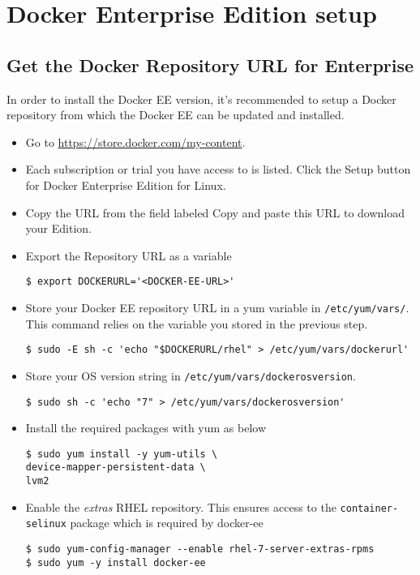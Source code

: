\documentclass[11pt]{article}
\author{Sampath Singamsetty}
\date{\today}
\title{}
\begin{document}
\tableofcontents

\section{Docker Enterprise Edition setup}
\label{sec:orga56b331}
\subsection{Get the Docker Repository URL for Enterprise}
\label{sec:orgcea4a15}
In order to install the Docker EE version, it's recommended to setup a Docker repository from which the Docker EE can be updated and installed.
\begin{itemize}
\item Go to \url{https://store.docker.com/my-content}.
\item Each subscription or trial you have access to is listed. Click the Setup button for Docker Enterprise Edition for Linux.
\item Copy the URL from the field labeled Copy and paste this URL to download your Edition.
\item Export the Repository URL as a variable
\begin{verbatim}
$ export DOCKERURL='<DOCKER-EE-URL>'
\end{verbatim}
\item Store your Docker EE repository URL in a yum variable in \texttt{/etc/yum/vars/}. This command relies on the variable you stored in the previous step.
\begin{verbatim}
$ sudo -E sh -c 'echo "$DOCKERURL/rhel" > /etc/yum/vars/dockerurl'
\end{verbatim}
\item Store your OS version string in \texttt{/etc/yum/vars/dockerosversion}.
\begin{verbatim}
$ sudo sh -c 'echo "7" > /etc/yum/vars/dockerosversion'
\end{verbatim}
\item Install the required packages with yum as below
\begin{verbatim}
$ sudo yum install -y yum-utils \
device-mapper-persistent-data \
lvm2
\end{verbatim}
\item Enable the \emph{extras} RHEL repository. This ensures access to the \texttt{container-selinux} package which is required by docker-ee
\begin{verbatim}
$ sudo yum-config-manager --enable rhel-7-server-extras-rpms
$ sudo yum -y install docker-ee
\end{verbatim}
\end{itemize}
\end{document}
